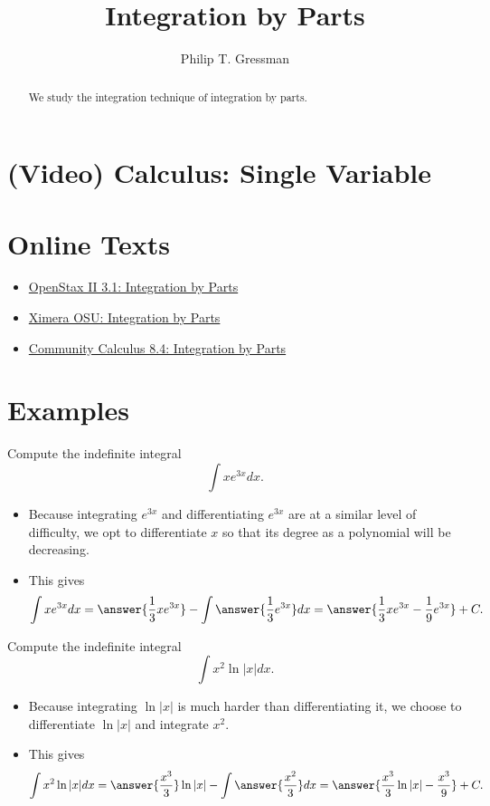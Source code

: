 \documentclass{ximera}
\title{Integration by Parts}
\author{Philip T. Gressman}
\begin{document}
\begin{abstract}
We study the integration technique of integration by parts.
\end{abstract}
\maketitle

\section*{(Video) Calculus: Single Variable}


\section*{Online Texts}
\begin{itemize}
\item \href{https://openstax.org/books/calculus-volume-2/pages/3-1-integration-by-parts}{OpenStax II 3.1: Integration by Parts}
\item \href{https://ximera.osu.edu/mooculus/calculus2/integrationByParts/titlePage}{Ximera OSU: Integration by Parts}
\item \href{https://www.whitman.edu/mathematics/calculus_online/section08.04.html}{Community Calculus 8.4: Integration by Parts}
\end{itemize}

\section*{Examples}


\begin{example}
Compute the indefinite integral
\[ \int x e^{3x} dx. \]
\begin{itemize}
\item Because integrating $e^{3x}$ and differentiating $e^{3x}$ are at a similar level of difficulty, we opt to differentiate $x$ so that its degree as a polynomial will be decreasing.
\item This gives
\[ \int x e^{3x} dx = \answer{\frac{1}{3} x e^{3x}} - \int \answer{ \frac{1}{3} e^{3x} } dx = \answer{ \frac{1}{3} x e^{3x} - \frac{1}{9} e^{3x} } + C. \]
\end{itemize}
\end{example}


\begin{example}
Compute the indefinite integral
\[ \int x^2 \ln |x| dx. \]
\begin{itemize}
\item Because integrating $\ln |x|$ is much harder than differentiating it, we choose to differentiate $\ln |x|$ and integrate $x^2$. 
\item This gives
\[ \int x^2 \ln |x| dx = \answer{\frac{x^3}{3}} \ln |x| - \int \answer{\frac{x^2}{3}} dx = \answer{ \frac{x^3}{3} \ln |x| - \frac{x^3}{9}} + C. \]
\end{itemize}
\end{example}
\end{document}
